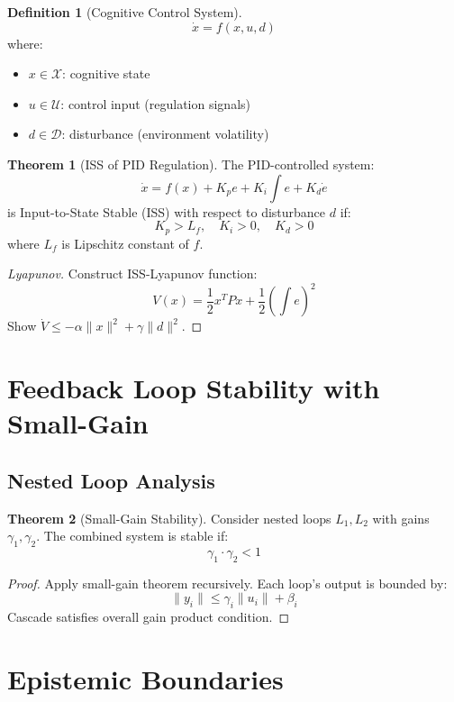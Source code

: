 \documentclass[12pt]{article}
\theoremstyle{definition}
\newtheorem{definition}{Definition}[section]
\newtheorem{theorem}{Theorem}[section]
\begin{document}
\begin{definition}[Cognitive Control System]
\[
\dot{x} = f(x, u, d)
\]
where:
\begin{itemize}
    \item $x \in \mathcal{X}$: cognitive state
    \item $u \in \mathcal{U}$: control input (regulation signals)
    \item $d \in \mathcal{D}$: disturbance (environment volatility)
\end{itemize}
\end{definition}

\begin{theorem}[ISS of PID Regulation]
The PID-controlled system:
\[
\dot{x} = f(x) + K_p e + K_i \int e + K_d \dot{e}
\]
is Input-to-State Stable (ISS) with respect to disturbance $d$ if:
\[
K_p > L_f, \quad K_i > 0, \quad K_d > 0
\]
where $L_f$ is Lipschitz constant of $f$.
\end{theorem}

\begin{proof}[Lyapunov]
Construct ISS-Lyapunov function:
\[
V(x) = \frac{1}{2}x^T P x + \frac{1}{2}\left(\int e\right)^2
\]
Show $\dot{V} \leq -\alpha\|x\|^2 + \gamma\|d\|^2$.
\end{proof}

\section{Feedback Loop Stability with Small-Gain}

\subsection{Nested Loop Analysis}

\begin{theorem}[Small-Gain Stability]
Consider nested loops $L_1, L_2$ with gains $\gamma_1, \gamma_2$. The combined system is stable if:
\[
\gamma_1 \cdot \gamma_2 < 1
\]
\end{theorem}

\begin{proof}
Apply small-gain theorem recursively. Each loop's output is bounded by:
\[
\|y_i\| \leq \gamma_i \|u_i\| + \beta_i
\]
Cascade satisfies overall gain product condition.
\end{proof}

\section{Epistemic Boundaries}
\end{document}
